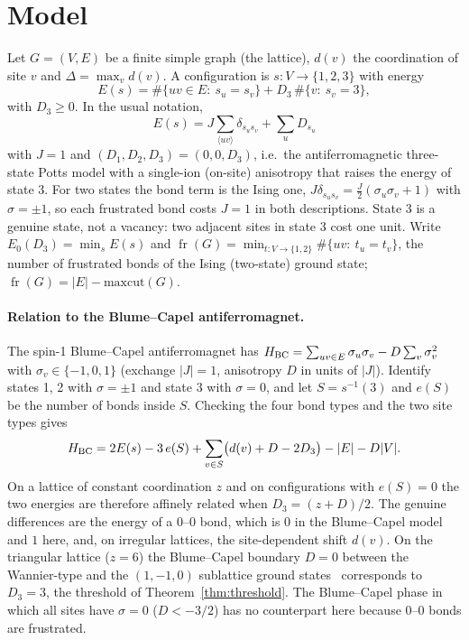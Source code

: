 \documentclass[aps,pre,twocolumn,superscriptaddress,showpacs]{revtex4-2}
\theoremstyle{definition}
\theoremstyle{remark}
\newcommand{\fr}{\operatorname{fr}}
\newcommand{\OPT}{E_0}
\begin{document}
\section{Model}
\label{sec:model}
Let $G=(V,E)$ be a finite simple graph (the lattice), $d(v)$ the coordination of site $v$ and
$\Delta=\max_v d(v)$. A configuration is $s:V\to\{1,2,3\}$ with energy
\begin{equation}
E(s)=\#\{uv\in E:\ s_u=s_v\}+D_3\,\#\{v:\ s_v=3\},
\label{eq:H}
\end{equation}
with $D_3\ge 0$. In the usual notation,
\begin{equation}
E(s)=J\sum_{\langle uv\rangle}\delta_{s_us_v}+\sum_u D_{s_u}
\label{eq:Hstd}
\end{equation}
with $J=1$ and $(D_1,D_2,D_3)=(0,0,D_3)$, i.e.\ the antiferromagnetic three-state Potts model with a single-ion (on-site) anisotropy that
raises the energy of state 3. For two states the bond term is the Ising one,
$J\delta_{s_us_v}=\tfrac J2(\sigma_u\sigma_v+1)$ with $\sigma=\pm1$, so each frustrated bond costs
$J=1$ in both descriptions.
State 3 is a genuine state, not a vacancy: two adjacent sites in state 3 cost one unit.
Write $\OPT(D_3)=\min_s E(s)$ and $\fr(G)=\min_{t:V\to\{1,2\}}\#\{uv:\ t_u=t_v\}$, the number of
frustrated bonds of the Ising (two-state) ground state; $\fr(G)=|E|-\mathrm{maxcut}(G)$.

\paragraph*{Relation to the Blume--Capel antiferromagnet.}
The spin-1 Blume--Capel antiferromagnet has $H_{\rm BC}=\sum_{uv\in E}\sigma_u\sigma_v-D\sum_v\sigma_v^2$
with $\sigma_v\in\{-1,0,1\}$ (exchange $|J|=1$, anisotropy $D$ in units of $|J|$).
Identify states 1, 2 with $\sigma=\pm1$ and state 3 with $\sigma=0$, and let $S=s^{-1}(3)$ and
$e(S)$ be the number of bonds inside $S$. Checking the four bond types and the two site types gives
\begin{equation}
H_{\rm BC}=2E(s)-3\,e(S)+\sum_{v\in S}\bigl(d(v)+D-2D_3\bigr)-|E|-D|V| .
\label{eq:BC}
\end{equation}
On a lattice of constant coordination $z$ and on configurations with $e(S)=0$ the two energies are
therefore affinely related when $D_3=(z+D)/2$. The genuine differences are the energy of a
$0$--$0$ bond, which is $0$ in the Blume--Capel model and $1$ here, and, on irregular lattices, the
site-dependent shift $d(v)$. On the triangular lattice ($z=6$) the Blume--Capel boundary $D=0$
between the Wannier-type and the $(1,-1,0)$ sublattice ground states~\cite{Zukovic2013}
corresponds to $D_3=3$, the threshold of Theorem~\ref{thm:threshold}. The Blume--Capel phase in
which all sites have $\sigma=0$ ($D<-3/2$) has no counterpart here because $0$--$0$ bonds are
frustrated.
\end{document}
